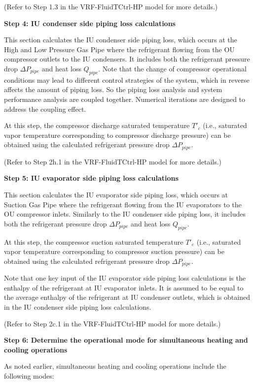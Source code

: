 (Refer to Step 1.3 in the VRF-FluidTCtrl-HP model for more details.)

\textbf{Step 4: IU condenser side piping loss calculations}

This section calculates the IU condenser side piping loss, which occurs at the High and Low Pressure Gas Pipe where the refrigerant flowing from the OU compressor outlets to the IU condensers. It includes both the refrigerant pressure drop $\Delta{P_{pipe}}$ and heat loss $Q_{pipe}$. Note that the change of compressor operational conditions may lead to different control strategies of the system, which in reverse affects the amount of piping loss. So the piping loss analysis and system performance analysis are coupled together. Numerical iterations are designed to address the coupling effect.

At this step, the compressor discharge saturated temperature $T'_c$ (i.e., saturated vapor temperature corresponding to compressor discharge pressure) can be obtained using the calculated refrigerant pressure drop $\Delta{P_{pipe}}$.

(Refer to Step 2h.1 in the VRF-FluidTCtrl-HP model for more details.)

\textbf{Step 5: IU evaporator side piping loss calculations}

This section calculates the IU evaporator side piping loss, which occurs at Suction Gas Pipe where the refrigerant flowing from the IU evaporators to the OU compressor inlets. Similarly to the IU condenser side piping loss, it includes both the refrigerant pressure drop $\Delta{P_{pipe}}$ and heat loss $Q_{pipe}$. 

At this step, the compressor suction saturated temperature $T'_e$ (i.e., saturated vapor temperature corresponding to compressor suction pressure) can be obtained using the calculated refrigerant pressure drop $\Delta{P_{pipe}}$.

Note that one key input of the IU evaporator side piping loss calculations is the enthalpy of the refrigerant at IU evaporator inlets. It is assumed to be equal to the average enthalpy of the refrigerant at IU condenser outlets, which is obtained in the IU condenser side piping loss calculations.

(Refer to Step 2c.1 in the VRF-FluidTCtrl-HP model for more details.)

\textbf{Step 6: Determine the operational mode for simultaneous heating and cooling operations}

As noted earlier, simultaneous heating and cooling operations include the following modes:

